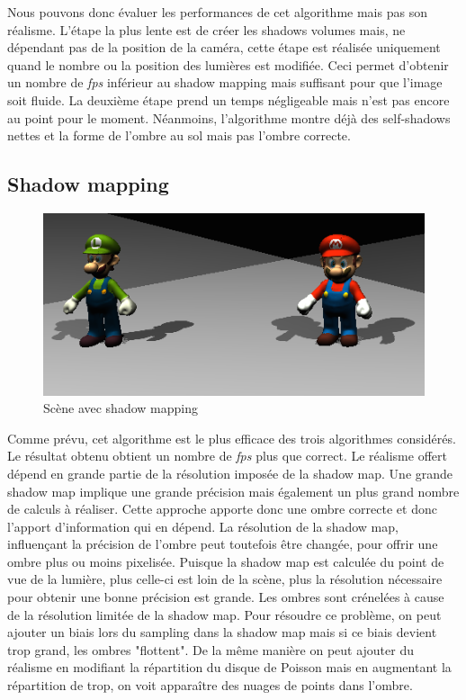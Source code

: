 \documentclass[a4paper,12pt]{report}
\begin{document}
Nous pouvons donc évaluer les performances de cet algorithme mais pas son réalisme.
L'étape la plus lente est de créer les shadows volumes mais, ne dépendant pas de la position de la caméra, cette étape est réalisée uniquement quand le nombre ou la position des lumières est modifiée.
Ceci permet d'obtenir un nombre de \textit{fps} inférieur au shadow mapping mais suffisant pour que l'image soit fluide.
La deuxième étape prend un temps négligeable mais n'est pas encore au point pour le moment. Néanmoins, l'algorithme montre déjà des self-shadows nettes et la forme de l'ombre au sol mais pas l'ombre correcte.



\subsection{Shadow mapping}

\begin{figure}[H]
\includegraphics[scale=0.4]{images/shadowmap.png}
\centering
\caption{Scène avec shadow mapping}
\end{figure}

Comme prévu, cet algorithme est le plus efficace des trois algorithmes considérés. Le résultat obtenu obtient un nombre de \textit{fps} plus que correct. Le réalisme offert dépend en grande partie de la résolution imposée de la shadow map. Une grande shadow map implique une grande précision mais également un plus grand nombre de calculs à réaliser. Cette approche apporte donc une ombre correcte et donc l'apport d'information qui en dépend. La résolution de la shadow map, influençant la précision de l'ombre peut toutefois être changée, pour offrir une ombre plus ou moins pixelisée. Puisque la shadow map est calculée du point de vue de la lumière, plus celle-ci est loin de la scène, plus la résolution nécessaire pour obtenir une bonne précision est grande.
Les ombres sont crénelées à cause de la résolution limitée de la shadow map. Pour résoudre ce problème, on peut ajouter un biais lors du sampling dans la shadow map mais si ce biais devient trop grand, les ombres "flottent".
De la même manière on peut ajouter du réalisme en modifiant la répartition du disque de Poisson mais en augmentant la répartition de trop, on voit apparaître des nuages de points dans l'ombre.
\end{document}
